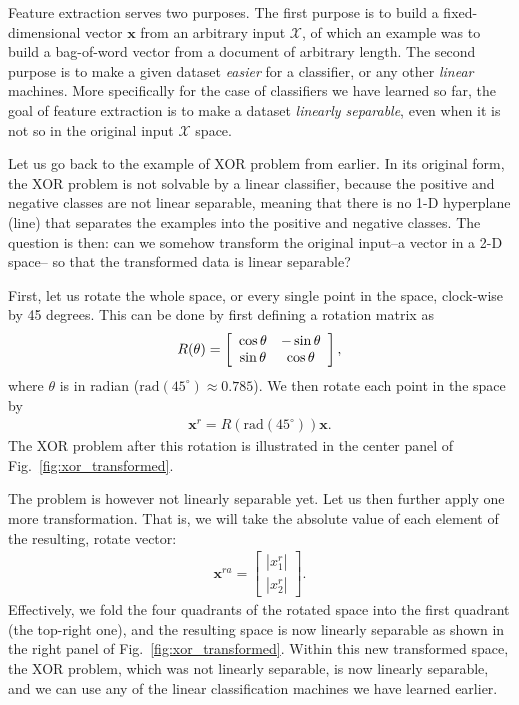 \documentclass{report}
\newcommand{\vect}[1]{\mathbf{#1}}
\newcommand{\vx}[0]{\vect{x}}
\begin{document}
Feature extraction serves two purposes. The first purpose is to build a
fixed-dimensional vector $\vx$ from an arbitrary input $\mathcal{X}$, of which
an example was to build a bag-of-word vector from a document of arbitrary
length. The second purpose is to make a given dataset {\it easier} for a
classifier, or any other {\it linear} machines. More specifically for the case
of classifiers we have learned so far, the goal of feature extraction is to make
a dataset {\it linearly separable}, even when it is not so in the original input
$\mathcal{X}$ space. 

Let us go back to the example of XOR problem from earlier. In its original form,
the XOR problem is not solvable by a linear classifier, because the positive and
negative classes are not linear separable, meaning that there is no 1-D
hyperplane (line) that separates the examples into the positive and negative
classes. The question is then: can we somehow transform the original input--a
vector in a 2-D space-- so that the transformed data is linear separable?

First, let us rotate the whole space, or every single point in the space,
clock-wise by 45 degrees. This can be done by first defining a rotation matrix
as
\begin{align*}
    R(\theta) = \left[
        \begin{array}{c c}
            \cos \theta & -\sin \theta \\
            \sin \theta & \cos \theta
        \end{array}
    \right],
\end{align*}
where $\theta$ is in radian ($\text{rad}(45^\circ) \approx 0.785$). We then
rotate each point in the space by
\begin{align*}
    \vx^r = R(\text{rad}(45^\circ)) \vx.
\end{align*}
The XOR problem after this rotation is illustrated in the center panel of
Fig.~\ref{fig:xor_transformed}. 

The problem is however not linearly separable yet. Let us then further apply one
more transformation. That is, we will take the absolute value of each element of
the resulting, rotate vector:
\begin{align*}
    \vx^{ra} = \left[ 
        \begin{array}{c}
            |x^r_1| \\
            |x^r_2|
        \end{array}
    \right].
\end{align*}
Effectively, we fold the four quadrants of the rotated space into the first
quadrant (the top-right one), and the resulting space is now linearly separable
as shown in the right panel of Fig.~\ref{fig:xor_transformed}.  Within this new
transformed space, the XOR problem, which was not linearly separable, is now
linearly separable, and we can use any of the linear classification machines we
have learned earlier. 
\end{document}
